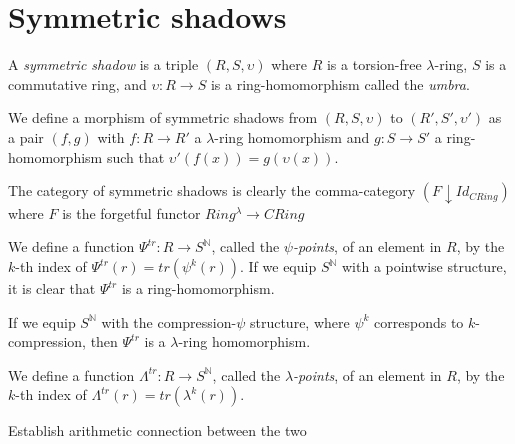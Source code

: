
\section{Symmetric shadows}

\begin{definition}
  A \emph{symmetric shadow} is a triple $(R, S, \upsilon)$ where $R$ is a torsion-free $\lambda$-ring, $S$ is a commutative ring, and $\upsilon: R \to S$ is a ring-homomorphism called the \emph{umbra}. 
\end{definition}

\begin{definition}
  We define a morphism of symmetric shadows from $(R, S, \upsilon)$ to $(R', S', \upsilon')$ as a pair $(f, g)$ with $f : R \to R'$ a $\lambda$-ring homomorphism and $g : S \to S'$ a ring-homomorphism such that $\upsilon'(f(x)) = g(\upsilon(x))$.
\end{definition}

\begin{remark}
  The category of symmetric shadows is clearly the comma-category $(F \downarrow Id_{CRing})$ where $F$ is the forgetful functor $Ring^{\lambda} \to CRing$
\end{remark}

\begin{definition}
  We define a function $\Psi^{tr} : R \to S^{\mathbb{N}}$, called the \emph{$\psi$-points}, of an element in $R$, by the $k$-th index of $\Psi^{tr}(r) = tr(\psi^k(r))$. If we equip $S^{\mathbb{N}}$ with a pointwise structure, it is clear that $\Psi^{tr}$ is a ring-homomorphism. 
\end{definition}

\begin{proposition}
  If we equip $S^{\mathbb{N}}$ with the compression-$\psi$ structure, where $\psi^k$ corresponds to $k$-compression, then $\Psi^{tr}$ is a $\lambda$-ring homomorphism.
\end{proposition}

\begin{definition}
    We define a function $\Lambda^{tr} : R \to S^{\mathbb{N}}$, called the \emph{$\lambda$-points}, of an element in $R$, by the $k$-th index of $\Lambda^{tr}(r) = tr(\lambda^k(r))$. 
\end{definition}

\begin{proposition} 
  Establish arithmetic connection between the two
\end{proposition}

